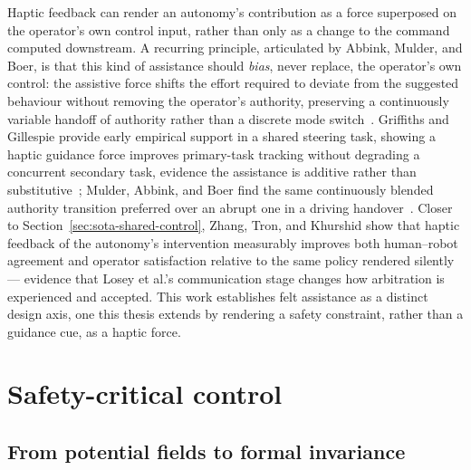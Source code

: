 Haptic feedback can render an autonomy's contribution as a force superposed on the operator's own control input, rather than only as a change to the command computed downstream. A recurring principle, articulated by Abbink, Mulder, and Boer, is that this kind of assistance should \emph{bias}, never replace, the operator's own control: the assistive force shifts the effort required to deviate from the suggested behaviour without removing the operator's authority, preserving a continuously variable handoff of authority rather than a discrete mode switch~\cite{abbink2012hapticshared}. Griffiths and Gillespie provide early empirical support in a shared steering task, showing a haptic guidance force improves primary-task tracking without degrading a concurrent secondary task, evidence the assistance is additive rather than substitutive~\cite{griffiths2005sharing}; Mulder, Abbink, and Boer find the same continuously blended authority transition preferred over an abrupt one in a driving handover~\cite{mulder2012sharingcontrol}. Closer to Section~\ref{sec:sota-shared-control}, Zhang, Tron, and Khurshid show that haptic feedback of the autonomy's intervention measurably improves both human--robot agreement and operator satisfaction relative to the same policy rendered silently~\cite{zhang2021hapticagreement} --- evidence that Losey et al.'s communication stage changes how arbitration is experienced and accepted. This work establishes felt assistance as a distinct design axis, one this thesis extends by rendering a safety constraint, rather than a guidance cue, as a haptic force.

\section{Safety-critical control}
\label{sec:sota-safety-critical}

\subsection{From potential fields to formal invariance}
\label{sec:sota-potential-fields}

